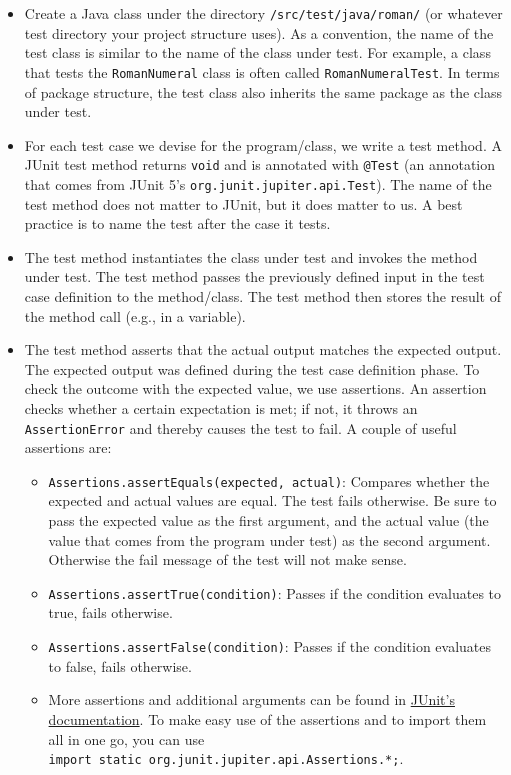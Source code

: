 \begin{itemize}
\item
  Create a Java class under the directory \texttt{/src/test/java/roman/}
  (or whatever test directory your project structure uses). As a
  convention, the name of the test class is similar to the name of the
  class under test. For example, a class that tests the
  \texttt{RomanNumeral} class is often called \texttt{RomanNumeralTest}.
  In terms of package structure, the test class also inherits the same
  package as the class under test.
\item
  For each test case we devise for the program/class, we write a test
  method. A JUnit test method returns \texttt{void} and is annotated
  with \texttt{@Test} (an annotation that comes from JUnit 5's
  \texttt{org.junit.jupiter.api.Test}). The name of the test method does
  not matter to JUnit, but it does matter to us. A best practice is to
  name the test after the case it tests.
\item
  The test method instantiates the class under test and invokes the
  method under test. The test method passes the previously defined input
  in the test case definition to the method/class. The test method then
  stores the result of the method call (e.g., in a variable).
\item
  The test method asserts that the actual output matches the expected
  output. The expected output was defined during the test case
  definition phase. To check the outcome with the expected value, we use
  assertions. An assertion checks whether a certain expectation is met;
  if not, it throws an \texttt{AssertionError} and thereby causes the
  test to fail. A couple of useful assertions are:

  \begin{itemize}
  \tightlist
  \item
    \texttt{Assertions.assertEquals(expected,\ actual)}: Compares
    whether the expected and actual values are equal. The test fails
    otherwise. Be sure to pass the expected value as the first argument,
    and the actual value (the value that comes from the program under
    test) as the second argument. Otherwise the fail message of the test
    will not make sense.
  \item
    \texttt{Assertions.assertTrue(condition)}: Passes if the condition
    evaluates to true, fails otherwise.
  \item
    \texttt{Assertions.assertFalse(condition)}: Passes if the condition
    evaluates to false, fails otherwise.
  \item
    More assertions and additional arguments can be found in
    \href{https://junit.org/junit5/docs/current/api/org.junit.jupiter.api/org/junit/jupiter/api/Assertions.html}{JUnit's
    documentation}. To make easy use of the assertions and to import
    them all in one go, you can use
    \texttt{import\ static\ org.junit.jupiter.api.Assertions.*;}.
  \end{itemize}
\end{itemize}

